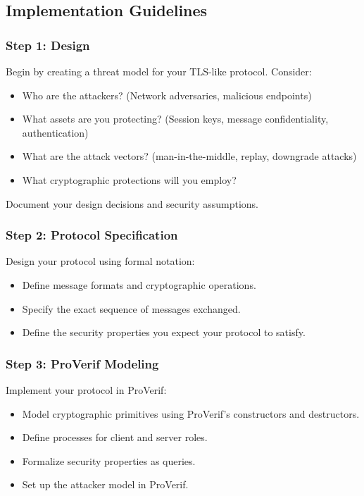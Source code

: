 \documentclass[10pt,a4paper,american]{exam}
\begin{document}
\subsection*{Implementation Guidelines}

\subsubsection*{Step 1: Design}
Begin by creating a threat model for your TLS-like protocol. Consider:
\begin{itemize}
	\item Who are the attackers? (Network adversaries, malicious endpoints)
	\item What assets are you protecting? (Session keys, message confidentiality, authentication)
	\item What are the attack vectors? (man-in-the-middle, replay, downgrade attacks)
	\item What cryptographic protections will you employ?
\end{itemize}

Document your design decisions and security assumptions.

\subsubsection*{Step 2: Protocol Specification}
Design your protocol using formal notation:
\begin{itemize}
	\item Define message formats and cryptographic operations.
	\item Specify the exact sequence of messages exchanged.
	\item Define the security properties you expect your protocol to satisfy.
\end{itemize}

\subsubsection*{Step 3: ProVerif Modeling}
Implement your protocol in ProVerif:
\begin{itemize}
	\item Model cryptographic primitives using ProVerif's constructors and destructors.
	\item Define processes for client and server roles.
	\item Formalize security properties as queries.
	\item Set up the attacker model in ProVerif.
\end{itemize}
\end{document}
